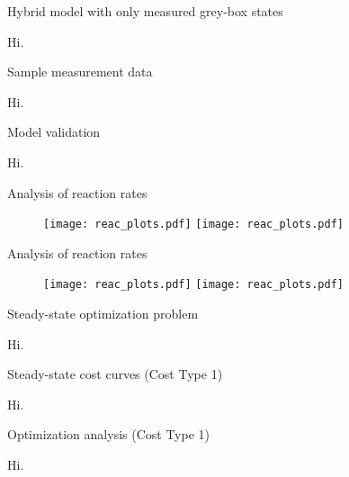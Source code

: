 \documentclass[xcolor=dvipsnames, 8pt]{beamer} %
\begin{document}
\begin{frame}{Hybrid model with only measured grey-box states}

	Hi.

\end{frame}

\begin{frame}{Sample measurement data}

	Hi.

\end{frame}

\begin{frame}{Model validation}

	Hi.

\end{frame}

\begin{frame}{Analysis of reaction rates}

	\begin{figure}
		\centering
		\texttt{[image: reac\_plots.pdf]}
		\texttt{[image: reac\_plots.pdf]}
	\end{figure}

\end{frame}

\begin{frame}{Analysis of reaction rates}
	
	\begin{figure}
		\centering
		\texttt{[image: reac\_plots.pdf]}
		\texttt{[image: reac\_plots.pdf]}
	\end{figure}
	
\end{frame}

\begin{frame}{Steady-state optimization problem}

	Hi.

\end{frame}

\begin{frame}{Steady-state cost curves (Cost Type 1)}

	Hi.

\end{frame}

\begin{frame}{Optimization analysis (Cost Type 1)}

	Hi.

\end{frame}
\end{document}
